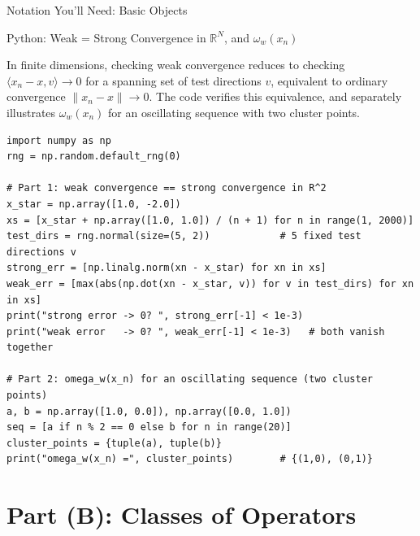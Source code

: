 \documentclass[aspectratio=169,10pt]{beamer}
\newcommand{\R}{\mathbb{R}}
\begin{document}
\begin{frame}[allowframebreaks]{Notation You'll Need: Basic Objects}
\end{frame}

\begin{frame}[fragile]{Python: Weak = Strong Convergence in $\R^N$, and $\omega_w(x_n)$}

In finite dimensions, checking weak convergence reduces to checking
$\langle x_n - x, v\rangle \to 0$ for a spanning set of test directions $v$,
equivalent to ordinary convergence $\|x_n - x\| \to 0$. The code verifies
this equivalence, and separately illustrates $\omega_w(x_n)$ for an
oscillating sequence with two cluster points.

\begin{lstlisting}[style=pycode]
import numpy as np
rng = np.random.default_rng(0)

# Part 1: weak convergence == strong convergence in R^2
x_star = np.array([1.0, -2.0])
xs = [x_star + np.array([1.0, 1.0]) / (n + 1) for n in range(1, 2000)]
test_dirs = rng.normal(size=(5, 2))            # 5 fixed test directions v
strong_err = [np.linalg.norm(xn - x_star) for xn in xs]
weak_err = [max(abs(np.dot(xn - x_star, v)) for v in test_dirs) for xn in xs]
print("strong error -> 0? ", strong_err[-1] < 1e-3)
print("weak error   -> 0? ", weak_err[-1] < 1e-3)   # both vanish together

# Part 2: omega_w(x_n) for an oscillating sequence (two cluster points)
a, b = np.array([1.0, 0.0]), np.array([0.0, 1.0])
seq = [a if n % 2 == 0 else b for n in range(20)]
cluster_points = {tuple(a), tuple(b)}
print("omega_w(x_n) =", cluster_points)        # {(1,0), (0,1)}
\end{lstlisting}

\end{frame}

\section{Part (B): Classes of Operators}
\end{document}
